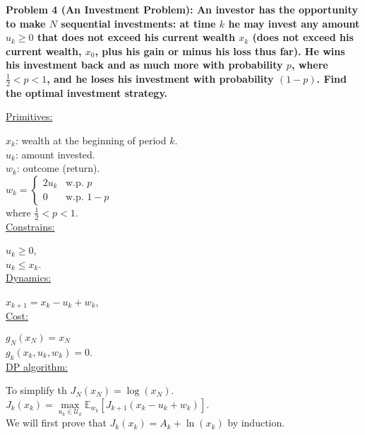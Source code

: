 \documentclass[11pt, english]{article}
\begin{document}
\textbf{Problem 4 (An Investment Problem): An investor has the opportunity to make $N$ sequential investments: at time $k$ he may invest any amount $u_k\geq 0$ that does not exceed his current wealth $x_k$ (does not exceed his current wealth, $x_0$, plus his gain or minus his loss thus far). He wins his investment back and as much more with probability $p$, where $\frac{1}{2}<p<1$, and he loses his investment with probability $(1-p)$. Find the optimal investment strategy.\\}

\underline{Primitives:\\} 

$x_k$: wealth at the beginning of period $k$.\\
$u_k$: amount invested.\\
$w_k$: outcome (return).\\
$w_k=\left\{\begin{array}{ll}
2u_k & \text{w.p. }p\\
0 & \text{w.p. }1-p
\end{array}\right.$\\
where $\frac{1}{2}<p<1$.\\

\underline{Constrains:\\}

$u_k\geq 0$, \\
$u_k\leq x_k$.\\

\underline{Dynamics:\\}

$x_{k+1}=x_k-u_k+w_k$, \\

\underline{Cost:\\}

$g_N(x_N)=x_N$\\
$g_k(x_k,u_k,w_k)=0$. \\

\underline{DP algorithm:\\}

To simplify th
$J_N(x_N)=\log(x_N)$. \\
$J_k(x_k)=\underset{u_k\in \mathcal{U}_k}{\max}\mathbb{E}_{w_k}\left[J_{k+1}(x_k-u_k+w_k)\right]$.\\
We will first prove that $J_k(x_k)=A_k+\ln(x_k)$ by induction.
\end{document}

